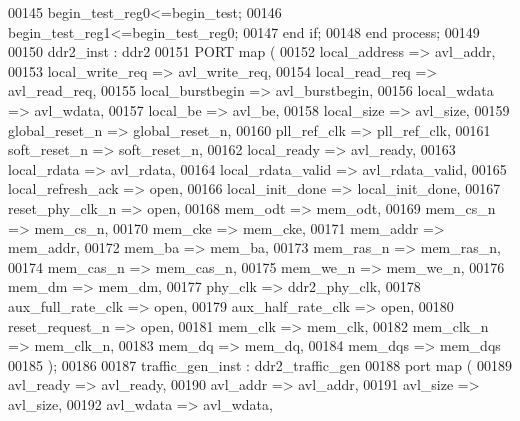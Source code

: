 \begin{DoxyCode}
00145 \textcolor{vhdlkeyword}{        begin}\textcolor{vhdlchar}{\_test\_reg0}\textcolor{vhdlchar}{<=}\textcolor{vhdlchar}{begin_test};
00146 \textcolor{vhdlkeyword}{        begin}\textcolor{vhdlchar}{\_test\_reg1}\textcolor{vhdlchar}{<=}\textcolor{vhdlchar}{begin_test_reg0};
00147     \textcolor{keywordflow}{end} \textcolor{keywordflow}{if};
00148 \textcolor{keywordflow}{end} \textcolor{keywordflow}{process};
00149 
00150 ddr2_inst : ddr2
00151     \textcolor{keywordflow}{PORT} \textcolor{keywordflow}{map} (
00152         local_address       => avl_addr, 
00153         local_write_req => avl_write_req, 
00154         local_read_req      => avl_read_req, 
00155         local_burstbegin    => avl_burstbegin, 
00156         local_wdata         => avl_wdata, 
00157         local_be                => avl_be, 
00158         local_size          => avl_size, 
00159         global_reset_n      => global_reset_n, 
00160         pll_ref_clk         => pll_ref_clk, 
00161         soft_reset_n        => soft_reset_n, 
00162         local_ready         => avl_ready, 
00163         local_rdata         => avl_rdata, 
00164         local_rdata_valid   => avl_rdata_valid, 
00165         local_refresh_ack   => \textcolor{keywordflow}{open}, 
00166         local_init_done => local_init_done, 
00167         reset_phy_clk_n => \textcolor{keywordflow}{open}, 
00168         mem_odt             => mem_odt, 
00169         mem_cs_n                => mem_cs_n, 
00170         mem_cke             => mem_cke, 
00171         mem_addr                => mem_addr, 
00172         mem_ba              => mem_ba, 
00173         mem_ras_n           => mem_ras_n, 
00174         mem_cas_n           => mem_cas_n, 
00175         mem_we_n                => mem_we_n, 
00176         mem_dm              => mem_dm, 
00177         phy_clk             => ddr2_phy_clk, 
00178         aux_full_rate_clk   => \textcolor{keywordflow}{open}, 
00179         aux_half_rate_clk   => \textcolor{keywordflow}{open}, 
00180         reset_request_n => \textcolor{keywordflow}{open}, 
00181         mem_clk             => mem_clk, 
00182         mem_clk_n           => mem_clk_n, 
00183         mem_dq              => mem_dq, 
00184         mem_dqs             => mem_dqs 
00185     \textcolor{vhdlchar}{)};   
00186     
00187 traffic_gen_inst : ddr2\_traffic\_gen
00188     \textcolor{keywordflow}{port} \textcolor{keywordflow}{map} (
00189         avl\_ready               => avl_ready,
00190         avl\_addr                    => avl_addr,
00191         avl\_size                    => avl_size,
00192         avl\_wdata               => avl_wdata,

\end{DoxyCode}

